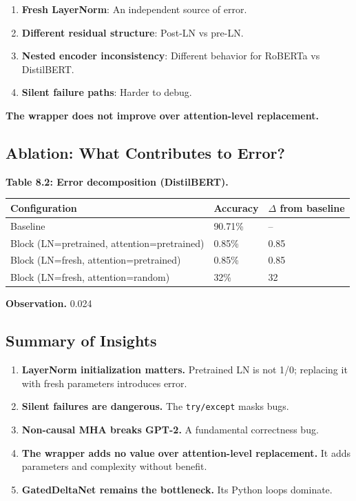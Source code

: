 \begin{enumerate}
\item \textbf{Fresh LayerNorm}: An independent source of error.
\item \textbf{Different residual structure}: Post-LN vs pre-LN.
\item \textbf{Nested encoder inconsistency}: Different behavior for RoBERTa vs DistilBERT.
\item \textbf{Silent failure paths}: Harder to debug.

\end{enumerate}
\textbf{The wrapper does not improve over attention-level replacement.}

\subsection{Ablation: What Contributes to Error?}

\textbf{Table 8.2: Error decomposition (DistilBERT).}

\begin{table}[H]
\centering
\small
\begin{tabular}{lll}
\toprule
\textbf{Configuration} & \textbf{Accuracy} & \textbf{$\Delta$ from baseline} \\
\midrule
Baseline & 90.71\% & -- \\
Block (LN=pretrained, attention=pretrained) & 0.85\% & 0.85 \\
Block (LN=fresh, attention=pretrained) & 0.85\% & 0.85 \\
Block (LN=fresh, attention=random) & 32\% & 32 \\
\bottomrule
\end{tabular}
\end{table}

\textbf{Observation.} 0.024

\subsection{Summary of Insights}

\begin{enumerate}
\item \textbf{LayerNorm initialization matters.} Pretrained LN is not 1/0; replacing
  it with fresh parameters introduces error.
\item \textbf{Silent failures are dangerous.} The \texttt{try/except} masks bugs.
\item \textbf{Non-causal MHA breaks GPT-2.} A fundamental correctness bug.
\item \textbf{The wrapper adds no value over attention-level replacement.} It adds
  parameters and complexity without benefit.
\item \textbf{GatedDeltaNet remains the bottleneck.} Its Python loops dominate.

\end{enumerate}
